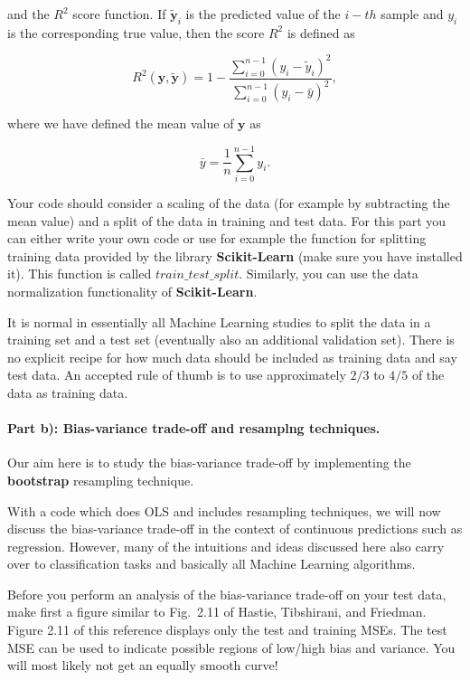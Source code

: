 \documentclass[%
oneside,                 %
final,                   %
10pt]{article}
\begin{document}
and the $R^2$ score function.  If $\tilde{\bm{y}}_i$ is the predicted
value of the $i-th$ sample and $y_i$ is the corresponding true value,
then the score $R^2$ is defined as

\[
R^2(\bm{y}, \tilde{\bm{y}}) = 1 - \frac{\sum_{i=0}^{n - 1} (y_i - \tilde{y}_i)^2}{\sum_{i=0}^{n - 1} (y_i - \bar{y})^2},
\]

where we have defined the mean value  of $\bm{y}$ as

\[
\bar{y} =  \frac{1}{n} \sum_{i=0}^{n - 1} y_i.
\]

Your code should consider  a scaling of the data (for example by
subtracting the mean value) and
a split of the data in training and test data. For this part you can
either write your own code or use for example the function for
splitting training data provided by the library \textbf{Scikit-Learn} (make
sure you have installed it).  This function is called
$train\_test\_split$. Similarly, you can use the data normalization functionality of
\textbf{Scikit-Learn}.

It is normal in essentially all Machine Learning studies to split the
data in a training set and a test set (eventually  also an additional
validation set).  There
is no explicit recipe for how much data should be included as training
data and say test data.  An accepted rule of thumb is to use
approximately $2/3$ to $4/5$ of the data as training data.

\paragraph{Part b): Bias-variance trade-off and resamplng techniques.}
Our aim here is to study the bias-variance trade-off by implementing the \textbf{bootstrap} resampling technique.

With a code which does OLS and includes resampling techniques, 
we will now discuss the bias-variance trade-off in the context of
continuous predictions such as regression. However, many of the
intuitions and ideas discussed here also carry over to classification
tasks and basically all Machine Learning algorithms. 

Before you perform an analysis of the bias-variance trade-off on your
test data, make first a figure similar to Fig.~2.11 of Hastie,
Tibshirani, and Friedman. Figure 2.11 of this reference displays only
the test and training MSEs. The test MSE can be used to indicate
possible regions of low/high bias and variance. You will most likely
not get an equally smooth curve!
\end{document}

